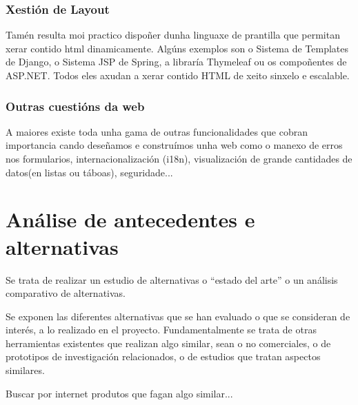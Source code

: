 	\subsection{Xestión de Layout}
		Tamén resulta moi practico dispoñer dunha linguaxe de prantilla que permitan xerar contido
		html dinamicamente. Algúns exemplos son o Sistema de Templates de Django, o Sistema JSP de Spring,
		a libraría Thymeleaf ou os compoñentes de ASP.NET. Todos eles axudan a xerar contido HTML de
		xeito sinxelo e escalable.
		
	\subsection{Outras cuestións da web}
		A maiores existe toda unha gama de outras funcionalidades que cobran importancia cando deseñamos
		e construímos unha web como o manexo de erros nos formularios, internacionalización (i18n), 
		visualización de grande cantidades de datos(en listas ou táboas), seguridade... 
  
  
\chapter{Análise de antecedentes e alternativas}
	Se trata de realizar un estudio de alternativas o “estado del arte” o un análisis comparativo
	de alternativas.

	Se exponen las diferentes alternativas que se han evaluado o que se consideran de interés, a
	lo realizado en el proyecto. Fundamentalmente se trata de otras herramientas existentes 
	que realizan algo similar, sean o no comerciales, o de prototipos de investigación relacionados,
	o de estudios que tratan aspectos similares.

	Buscar por internet produtos que fagan algo similar...
